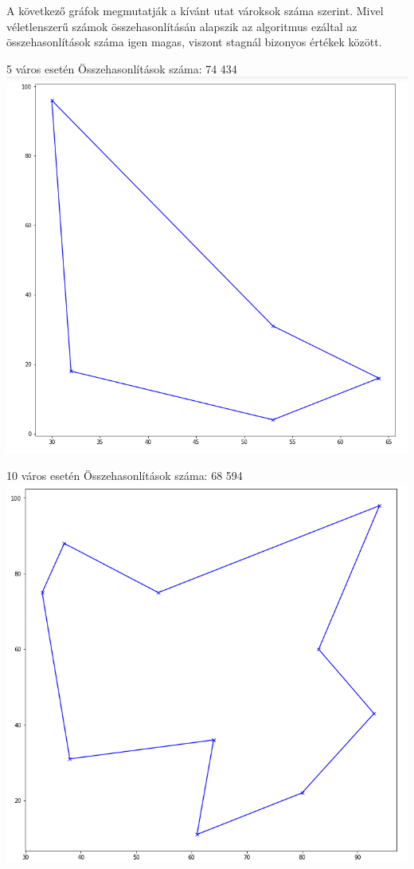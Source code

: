 \documentclass[12pt,a4paper]{article}
\begin{document}
A következő gráfok megmutatják a kívánt utat vároksok száma szerint. Mivel véletlenszerű számok összehasonlításán alapszik az algoritmus ezáltal az összehasonlítások száma igen magas, viszont stagnál bizonyos értékek között.

5 város esetén
Összehasonlítások száma: 74 434
\includegraphics[scale=0.4]{5.png}

10 város esetén
Összehasonlítások száma: 68 594
\includegraphics[scale=0.4]{10.png}
\end{document}
